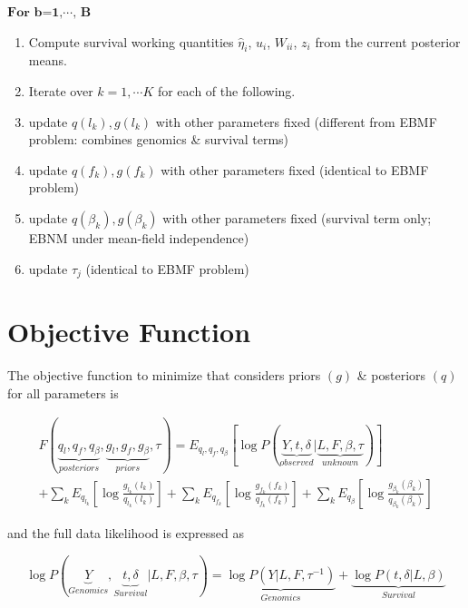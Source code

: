 \documentclass{article}[12pt]
\begin{document}
$\textbf{For b=1,$\cdots$, B}$

\begin{enumerate}
    \item Compute survival working quantities $\hat{\eta}_i$, $u_i$, $W_{ii}$, $z_i$
          from the current posterior means.

    \item Iterate over $k=1, \cdots K$ for each of the following.

    \item update $q(l_k), g(l_k)$ with other parameters fixed (different from EBMF problem: combines genomics \& survival terms)

    \item update $q(f_k), g(f_k)$ with other parameters fixed (identical to EBMF problem)

    \item update $q(\beta_k), g(\beta_k)$ with other parameters fixed (survival term only; EBNM under mean-field independence)

    \item update $\tau_{j}$ (identical to EBMF problem)
\end{enumerate}
\section{Objective Function}

The objective function to minimize that considers priors $(g)$ \& posteriors $(q)$ for all parameters is

\begin{multline}
    F\left(\underbrace{q_{l}, q_{f}, q_{\beta}}_{posteriors}, \underbrace{g_{l}, g_{f}, g_{\beta}}_{priors}, \tau\right) = E_{q_{l}, q_{f}, q_{\beta}}\left[\log P\left(\underbrace{Y, t, \delta}_{observed} \vert \underbrace{L, F, \beta, \tau}_{unknown}\right)\right]\\
    + \sum_{k}E_{q_{l_k}}\left[\log \frac{g_{l_k}(l_k)}{q_{l_k}(l_k)}\right] + \sum_{k}E_{q_{f_k}}\left[\log \frac{g_{f_k}(f_k)}{q_{f_k}(f_k)}\right] + \sum_{k}E_{q_{\beta}}\left[\log \frac{g_{\beta_k}(\beta_k)}{q_{\beta_k}(\beta_k)}\right]
\end{multline}

and the full data likelihood is expressed as

\begin{equation}
    \log P\left(\underbrace{Y}_{Genomics}, \underbrace{t, \delta}_{Survival} \vert L, F, \beta, \tau\right) = \underbrace{\log P\left(Y \vert L, F, \tau^{-1}\right)}_{Genomics} + \underbrace{\log P\left(t, \delta \vert L, \beta\right)}_{Survival}
\end{equation}
\end{document}
